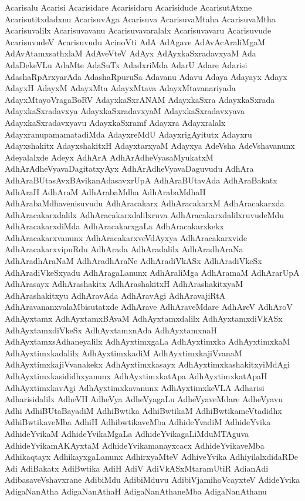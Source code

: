 {Acarisalu
Acarisi
Acarisidare
Acarisidaru
Acarisidude
AcarisutAtxne
Acarisutitxdadxnu
AcarisuvAga
Acarisuva
AcarisuvaMtaha
AcarisuvaMtha
Acarisuvalilx
Acarisuvavanu
Acarisuvavaralalx
Acarisuvavaru
Acarisuvude
AcarisuvudeV
Acarisuvudu
AcinoVti
AdA
AdAgave
AdAvAcAraliMgaM
AdAvAtamxsathxlaM
AdAveVteV
AdAyx
AdAyxkaSxradavxyaM
Ada
AdaDekeVLu
AdaMte
AdaSuTx
AdadxriMda
AdarU
Adare
Adarisi
AdashaRpArxyarAda
AdashaRpuruSa
Adavanu
Adavu
Adaya
Adayayx
Adayx
AdayxH
AdayxM
AdayxMta
AdayxMtava
AdayxMtavanariyada
AdayxMtayoVragaBoRV
AdayxkaSxrANAM
AdayxkaSxra
AdayxkaSxrada
AdayxkaSxradavxya
AdayxkaSxradavxyaM
AdayxkaSxradavxyava
AdayxkaSxradavxyavu
AdayxkaSxramf
Adayxra
Adayxralalx
AdayxranupamamatadiMda
AdayxreMdU
AdayxrigAyitutx
Adayxru
Adayxshakitx
AdayxshakitxH
AdayxtarxyaM
Adayxya
AdeVsha
AdeVshavanunx
Adeyalalxde
Adeyx
AdhArA
AdhArAdheVyasaMyukatxM
AdhArAdheVyavaDagitatxyAyx
AdhArAdheVyavaDaguvudu
AdhAra
AdhAraBUtasAvxBAvikanAdasavxrUpA
AdhAraBUtavAda
AdhAraBakatx
AdhAraH
AdhAraM
AdhArabaMdha
AdhArabaMdhaH
AdhArabaMdhavenisuvudu
AdhAracakarx
AdhAracakarxM
AdhAracakarxda
AdhAracakarxdalilx
AdhAracakarxdalilxruva
AdhAracakarxdalilxruvudeMdu
AdhAracakarxdiMda
AdhAracakarxgaLa
AdhAracakarxkekx
AdhAracakarxvanunx
AdhAracakarxveVdAyxya
AdhAracakarxvide
AdhAracakarxvipuRdu
AdhArada
AdhAradalilx
AdhAradhAraNa
AdhAradhAraNaM
AdhAradhAraNe
AdhAradiVkASx
AdhAradiVkeSx
AdhAradiVkeSxyadu
AdhAragaLanunx
AdhAraliMga
AdhAramaM
AdhArarUpA
AdhArasayx
AdhArashakitx
AdhArashakitxH
AdhArashakitxyaM
AdhArashakitxyu
AdhAravAda
AdhAravAgi
AdhAravajiRtA
AdhAravananxvalaMbisutatxde
AdhArave
AdhAraveMdare
AdhAreV
AdhAroV
AdhAyxtamx
AdhAyxtamxBAvaM
AdhAyxtamxdalilx
AdhAyxtamxdiVkASx
AdhAyxtamxdiVkeSx
AdhAyxtamxnAda
AdhAyxtamxnaH
AdhAyxtamxsAdhaneyalilx
AdhAyxtimxgaLa
AdhAyxtimxka
AdhAyxtimxkaM
AdhAyxtimxkadalilx
AdhAyxtimxkadiM
AdhAyxtimxkajiVvanaM
AdhAyxtimxkajiVvanakekx
AdhAyxtimxkasayx
AdhAyxtimxkashakitxyiMdAgi
AdhAyxtimxkasididhxyanunx
AdhAyxtimxkatApa
AdhAyxtimxkatApaH
AdhAyxtimxkavAgi
AdhAyxtimxkavanunx
AdhAyxtimxkeVLA
Adharisi
Adharisidalilx
AdheVH
AdheVya
AdheVyagaLu
AdheVyaveMdare
AdheVyavu
Adhi
AdhiBUtaBayadiM
AdhiBwtika
AdhiBwtikaM
AdhiBwtikameVtadidhx
AdhiBwtikaveMba
AdhiH
AdhibwtikaveMba
AdhideYvadiM
AdhideYvika
AdhideYvikaM
AdhideYvikaMgaLa
AdhideYvikagaLiMduMTAguva
AdhideYvikamAKAyxtaM
AdhideYvikamanayxcacx
AdhideYvikaveMba
Adhikaqtayx
AdhikayxgaLanunx
AdhirxyaMteV
AdhiveYvika
AdhiyilalxdidaRDe
Adi
AdiBakatx
AdiBwtika
AdiH
AdiV
AdiVkASxMtaramUtiR
AdianAdi
AdibasaveVshavxrane
AdibiMdu
AdibiMduvu
AdibiVjamihoVcayxteV
AdideYvika
AdigaNanAtha
AdigaNanAthaH
AdigaNanAthaneMba
AdigaNanAthanu
}
